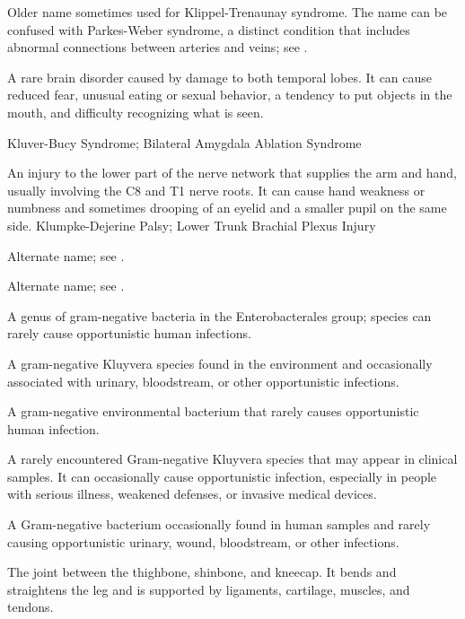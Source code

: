  Older name sometimes used for Klippel-Trenaunay syndrome. The name can be confused with Parkes-Weber syndrome, a distinct condition that includes abnormal connections between arteries and veins; see .

 A rare brain disorder caused by damage to both temporal lobes. It can cause reduced fear, unusual eating or sexual behavior, a tendency to put objects in the mouth, and difficulty recognizing what is seen.

\synonyms
Kluver-Bucy Syndrome; Bilateral Amygdala Ablation Syndrome

 An injury to the lower part of the nerve network that supplies the arm and hand, usually involving the C8 and T1 nerve roots. It can cause hand weakness or numbness and sometimes drooping of an eyelid and a smaller pupil on the same side.
\synonyms
Klumpke-Dejerine Palsy; Lower Trunk Brachial Plexus Injury

 Alternate name; see .

 Alternate name; see .

 A genus of gram-negative bacteria in the Enterobacterales group; species can rarely cause opportunistic human infections.

 A gram-negative Kluyvera species found in the environment and occasionally associated with urinary, bloodstream, or other opportunistic infections.

 A gram-negative environmental bacterium that rarely causes opportunistic human infection.

 A rarely encountered Gram-negative Kluyvera species that may appear in clinical samples. It can occasionally cause opportunistic infection, especially in people with serious illness, weakened defenses, or invasive medical devices.

 A Gram-negative bacterium occasionally found in human samples and rarely causing opportunistic urinary, wound, bloodstream, or other infections.

 The joint between the thighbone, shinbone, and kneecap. It bends and straightens the leg and is supported by ligaments, cartilage, muscles, and tendons.


